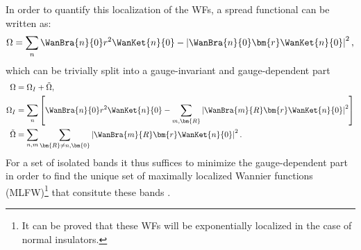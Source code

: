 \\\\
In order to quantify this localization of the WFs, a spread functional can be written as:
\begin{equation}
	\label{eq:Theory_spread}
	\Omega =\sum_n \WanBra{n}{0}r^2\WanKet{n}{0} - \left|\WanBra{n}{0}\bm{r}\WanKet{n}{0}\right|^2,
\end{equation}
which can be trivially split into a gauge-invariant and gauge-dependent part
\begin{align}
	\Omega &= \Omega_I + \tilde\Omega,  \\
	\Omega_I &= \sum_n \left[\WanBra{n}{0} r^2 \WanKet{n}{0} - \sum_{m,\bm{R}} \left| \WanBra{m}{R} \bm{r} \WanKet{n}{0}\right|^2\right] \label{eq:Theory_omegaI}\\
	\tilde\Omega &= \sum_{n,m} \sum_{\bm{R} \neq n,\bm{0}} \left|\WanBra{m}{R} \bm{r} \WanKet{n}{0}\right|^2.
\end{align}
For a set of isolated bands it thus suffices to minimize the gauge-dependent part in order to find the  unique set of maximally localized Wannier functions (MLFW)\footnote{It can be proved that these WFs will be exponentially localized in the case of normal insulators.} that consitute these bands \cite{Kunes2004, Marzari2012}.


